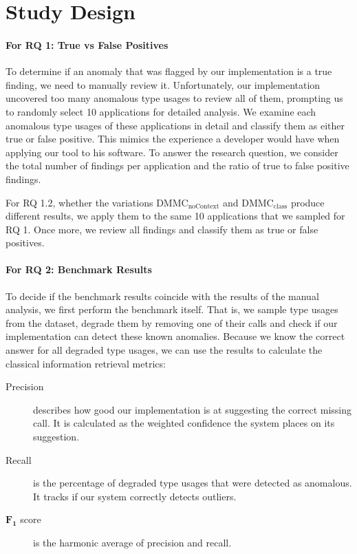\section{Study Design}


\paragraph{For RQ 1: True vs False Positives}

To determine if an anomaly that was flagged by our implementation is a true finding, we need to manually review it.
Unfortunately, our implementation uncovered too many anomalous type usages to review all of them, prompting us to randomly select 10 applications for detailed analysis.
We examine each anomalous type usages of these applications in detail and classify them as either true or false positive.
This mimics the experience a developer would have when applying our tool to his software.
To answer the research question, we consider the total number of findings per application and the ratio of true to false positive findings.

For RQ 1.2, whether the variations $\text{DMMC}_\text{noContext}$ and $\text{DMMC}_\text{class}$ produce different results, we apply them to the same 10 applications that we sampled for RQ 1.
Once more, we review all findings and classify them as true or false positives.

\paragraph{For RQ 2: Benchmark Results}

To decide if the benchmark results coincide with the results of the manual analysis, we first perform the benchmark itself.
That is, we sample type usages from the dataset, degrade them by removing one of their calls and check if our implementation can detect these known anomalies.
Because we know the correct answer for all degraded type usages, we can use the results to calculate the classical information retrieval metrics:
\begin{description}
    \item [Precision] describes how good our implementation is at suggesting the correct missing call. It is calculated as the weighted confidence the system places on its suggestion.
    \item [Recall] is the percentage of degraded type usages that were detected as anomalous. It tracks if our system correctly detects outliers.
    \item [$\mathbf{F_1}$ score] is the harmonic average of precision and recall.
\end{description}

